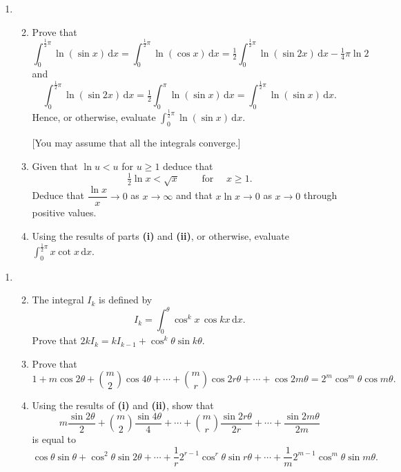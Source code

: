 \documentclass[a4, 11pt]{report}
\newlength{\qspace}
\newcounter{qnumber}
\newenvironment{question}%
 {\vspace{\qspace}
  \begin{enumerate}[\bfseries 1\quad][10]%
    \setcounter{enumi}{\value{qnumber}}%
    \item%
 }
{
  \end{enumerate}
  \filbreak
  \stepcounter{qnumber}
 }
\newenvironment{questionparts}[1][1]%
 {
  \begin{enumerate}[\bfseries (i)]%
    \setcounter{enumii}{#1}
    \addtocounter{enumii}{-1}
    \setlength{\itemsep}{5mm}
    \setlength{\parskip}{8pt}
 }
 {
  \end{enumerate}
 }
\begin{document}
\begin{question}
\begin{questionparts}
\item Prove that 
\[
\int_{0}^{\frac{1}{2}\pi}\ln(\sin x)\,\mathrm{d}x=\int_{0}^{\frac{1}{2}\pi}\ln(\cos x)\,\mathrm{d}x=\tfrac{1}{2}\int_{0}^{\frac{1}{2}\pi}\ln(\sin2x)\,\mathrm{d}x-\tfrac{1}{4}\pi\ln2
\]
and 
\[
\int_{0}^{\frac{1}{2}\pi}\ln(\sin2x)\,\mathrm{d}x=\tfrac{1}{2}\int_{0}^{\pi}\ln(\sin x)\,\mathrm{d}x=\int_{0}^{\frac{1}{2}\pi}\ln(\sin x)\,\mathrm{d}x.
\]
Hence, or otherwise, evaluate ${\displaystyle \int_{0}^{\frac{1}{2}\pi}\ln(\sin x)\,\mathrm{d}x.}$


{[}You may assume that all the integrals converge.{]}


\item Given that $\ln u<u$ for $u\geqslant1$ deduce that 
\[
\tfrac{1}{2}\ln x<\sqrt{x}\qquad\mbox{ for }\quad x\geqslant1.
\]
Deduce that $\dfrac{\ln x}{x}\rightarrow0$ as $x\rightarrow\infty$
and that $x\ln x\rightarrow0$ as $x\rightarrow0$ through positive
values. 


\item Using the results of parts \textbf{(i) }and \textbf{(ii)},
or otherwise, evaluate ${\displaystyle \int_{0}^{\frac{1}{2}\pi}x\cot x\,\mathrm{d}x.}$
\end{questionparts}
	\end{question}
	
	\begin{question}
\begin{questionparts}
\item The integral $I_{k}$ is defined by 
\[
I_{k}=\int_{0}^{\theta}\cos^{k}x\,\cos kx\,\mathrm{d}x.
\]
Prove that $2kI_{k}=kI_{k-1}+\cos^{k}\theta\sin k\theta.$
\item Prove that 
\[
1+m\cos2\theta+\binom{m}{2}\cos4\theta+\cdots+\binom{m}{r}\cos2r\theta+\cdots+\cos2m\theta=2^{m}\cos^{m}\theta\cos m\theta.
\]
\item Using the results of \textbf{(i) }and \textbf{(ii)}, show that
\[
m\frac{\sin2\theta}{2}+\binom{m}{2}\frac{\sin4\theta}{4}+\cdots+\binom{m}{r}\frac{\sin2r\theta}{2r}+\cdots+\frac{\sin2m\theta}{2m}
\]
is equal to 
\[
\cos\theta\sin\theta+\cos^{2}\theta\sin2\theta+\cdots+\frac{1}{r}2^{r-1}\cos^{r}\theta\sin r\theta+\cdots+\frac{1}{m}2^{m-1}\cos^{m}\theta\sin m\theta.
\]
\end{questionparts}
		\end{question}
		
\end{document}
